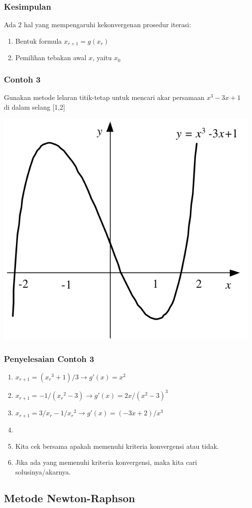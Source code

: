 \documentclass[pdflatex,compress]{beamer}
\begin{document}
\begin{frame}
	\frametitle{Kesimpulan}
	Ada 2 hal yang mempengaruhi kekonvergenan prosedur iterasi:
	\begin{enumerate}
		\item Bentuk formula $ x_{r+1} = g(x_r) $
		\item Pemilihan tebakan awal $ x $, yaitu $ x_0 $
	\end{enumerate}
\end{frame}

\begin{frame}
	\frametitle{Contoh 3}
	Gunakan metode lelaran titik-tetap untuk mencari akar persamaan $ x^3 - 3x + 1 $ di dalam selang [1,2]
	\begin{center}
		\includegraphics[width=0.5\linewidth]{img/img14}
	\end{center}
\end{frame}

\begin{frame}
	\frametitle{Penyelesaian Contoh 3}
	\begin{enumerate}
		\item $ x_{r+1} = ({x_r}^3 + 1)/3 \rightarrow g'(x) = x^2$ 
		\item $ x_{r+1} = -1/({x_r}^2-3) \rightarrow g'(x) = 2x/(x^2-3)^3$
		\item $ x_{r+1} = 3/x_r - 1/{x_r}^2 \rightarrow g'(x) = (-3x + 2)/x^3 $
		\item[]
		\item[] Kita cek bersama apakah memenuhi kriteria konvergensi atau tidak.
		\item[] Jika ada yang memenuhi kriteria konvergensi, maka kita cari solusinya/akarnya.
	\end{enumerate}
\end{frame}

\subsection{Metode Newton-Raphson}
\end{document}
